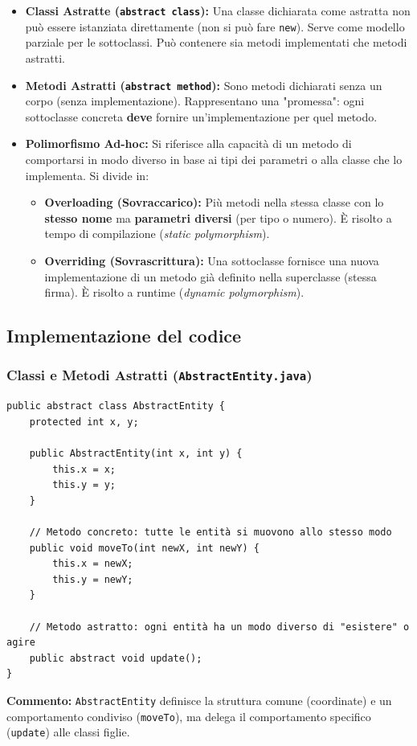 \documentclass[12pt, a4paper]{article}
\begin{document}
\begin{itemize}
    \item \textbf{Classi Astratte (\texttt{abstract class}):} Una classe dichiarata come astratta non può essere istanziata direttamente (non si può fare \texttt{new}). Serve come modello parziale per le sottoclassi. Può contenere sia metodi implementati che metodi astratti.
    \item \textbf{Metodi Astratti (\texttt{abstract method}):} Sono metodi dichiarati senza un corpo (senza implementazione). Rappresentano una "promessa": ogni sottoclasse concreta \textbf{deve} fornire un'implementazione per quel metodo.
    \item \textbf{Polimorfismo Ad-hoc:} Si riferisce alla capacità di un metodo di comportarsi in modo diverso in base ai tipi dei parametri o alla classe che lo implementa. Si divide in:
    \begin{itemize}
        \item \textbf{Overloading (Sovraccarico):} Più metodi nella stessa classe con lo \textbf{stesso nome} ma \textbf{parametri diversi} (per tipo o numero). È risolto a tempo di compilazione (\textit{static polymorphism}).
        \item \textbf{Overriding (Sovrascrittura):} Una sottoclasse fornisce una nuova implementazione di un metodo già definito nella superclasse (stessa firma). È risolto a runtime (\textit{dynamic polymorphism}).
    \end{itemize}
\end{itemize}

\newpage

\subsection{Implementazione del codice}

\subsubsection{Classi e Metodi Astratti (\texttt{AbstractEntity.java})}
\begin{verbatim}
public abstract class AbstractEntity {
    protected int x, y;

    public AbstractEntity(int x, int y) {
        this.x = x;
        this.y = y;
    }

    // Metodo concreto: tutte le entità si muovono allo stesso modo
    public void moveTo(int newX, int newY) {
        this.x = newX;
        this.y = newY;
    }

    // Metodo astratto: ogni entità ha un modo diverso di "esistere" o agire
    public abstract void update();
}
\end{verbatim}
\textbf{Commento:} \texttt{AbstractEntity} definisce la struttura comune (coordinate) e un comportamento condiviso (\texttt{moveTo}), ma delega il comportamento specifico (\texttt{update}) alle classi figlie.
\end{document}
